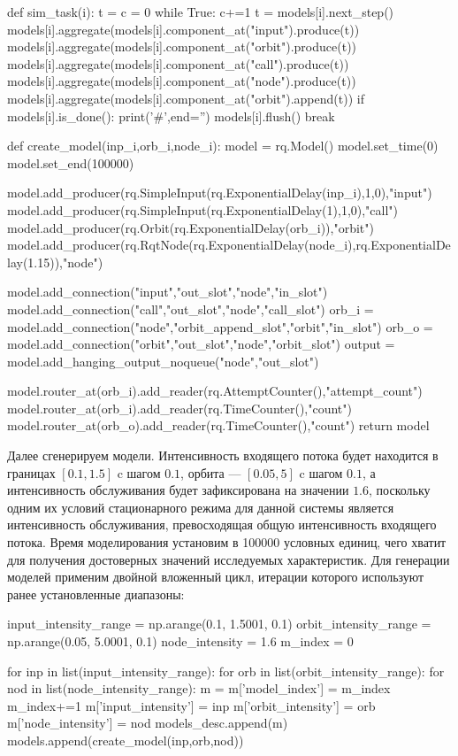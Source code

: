 \begin{pyin} 
def sim_task(i):
   t = c = 0
   while True:
      c+=1 
      t = models[i].next_step()
      models[i].aggregate(models[i].component_at("input").produce(t))
      models[i].aggregate(models[i].component_at("orbit").produce(t))
      models[i].aggregate(models[i].component_at("call").produce(t))
      models[i].aggregate(models[i].component_at("node").produce(t))
      models[i].aggregate(models[i].component_at("orbit").append(t))
      if models[i].is_done():
         print('#',end='')
         models[i].flush()
         break
\end{pyin}         

\begin{pyin}
def create_model(inp_i,orb_i,node_i):
model = rq.Model()
model.set_time(0) 
model.set_end(100000)

model.add_producer(rq.SimpleInput(rq.ExponentialDelay(inp_i),1,0),"input")
model.add_producer(rq.SimpleInput(rq.ExponentialDelay(1),1,0),"call")
model.add_producer(rq.Orbit(rq.ExponentialDelay(orb_i)),"orbit")
model.add_producer(rq.RqtNode(rq.ExponentialDelay(node_i),rq.ExponentialDelay(1.15)),"node")

model.add_connection("input","out_slot","node","in_slot")
model.add_connection("call","out_slot","node","call_slot")
orb_i = model.add_connection("node","orbit_append_slot","orbit","in_slot")
orb_o = model.add_connection("orbit","out_slot","node","orbit_slot")
output = model.add_hanging_output_noqueue("node","out_slot")

model.router_at(orb_i).add_reader(rq.AttemptCounter(),"attempt_count")
model.router_at(orb_i).add_reader(rq.TimeCounter(),"count")
model.router_at(orb_o).add_reader(rq.TimeCounter(),"count")
return model
\end{pyin}


Далее сгенерируем модели. Интенсивность входящего потока будет находится в границах $[0.1,1.5]$ c шагом $0.1$, орбита --- $[0.05,5]$ c шагом $0.1$, а интенсивность обслуживания будет зафиксирована на значении $1.6$, поскольку одним их условий стационарного режима для данной системы является интенсивность обслуживания, превосходящая общую интенсивность входящего потока. Время моделирования установим в 100000 условных единиц, чего хватит для получения достоверных значений исследуемых характеристик. Для генерации моделей применим двойной вложенный цикл, итерации которого используют ранее установленные диапазоны:
\begin{pyin} 
input_intensity_range = np.arange(0.1, 1.5001, 0.1)
orbit_intensity_range = np.arange(0.05, 5.0001, 0.1)
node_intensity = 1.6
m_index = 0

for inp in list(input_intensity_range):
for orb in list(orbit_intensity_range):
for nod in list(node_intensity_range):
   m = {}
   m['model_index'] = m_index
   m_index+=1
   m['input_intensity'] = inp
   m['orbit_intensity'] = orb
   m['node_intensity'] = nod
   models_desc.append(m)
   models.append(create_model(inp,orb,nod))
\end{pyin}

